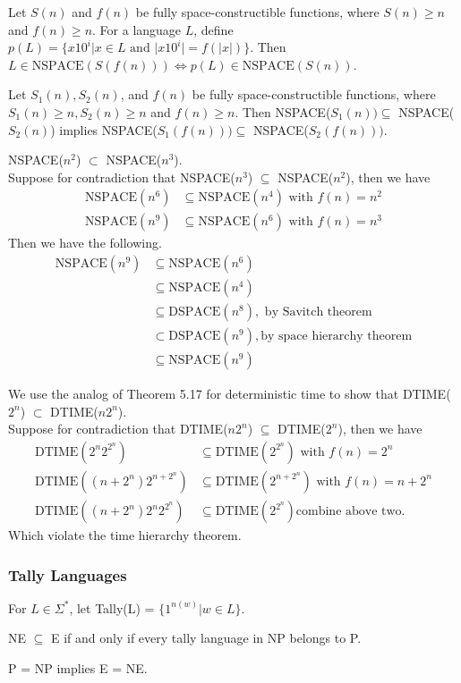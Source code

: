  Let $S(n)$ and $f(n)$ be fully space-constructible functions, where
$S(n) \ge n$ and $f(n) \ge n$. For a language $L$, define
$p(L) = \{x10^i | x \in L \text{ and }|x10^i | = f(|x|)\}$.
Then $L \in \text{NSPACE}(S(f(n))) \Leftrightarrow p(L) \in \text{NSPACE}(S(n))$.

 Let $S_1(n), S_2(n)$, and $f(n)$ be fully space-constructible functions,
where $S_1 (n) \ge n, S_2(n) \ge n$ and $f(n) \ge n$. Then
NSPACE($S_1(n)) \subseteq$ NSPACE($S_2(n)$) implies NSPACE($S_1(f(n)))
\subseteq$ NSPACE($S_2(f(n)))$.

 NSPACE($n^2$) $\subset$ NSPACE($n^3$).\\
Suppose for contradiction that NSPACE($n^3$) $\subseteq$ NSPACE($n^2$), then we 
have
\begin{align*}
  \text{NSPACE}(n^6) &\subseteq \text{NSPACE}(n^4) \text{ with } f(n)=n^2\\
  \text{NSPACE}(n^9) &\subseteq \text{NSPACE}(n^6) \text{ with } f(n)=n^3
\end{align*}
Then we have the following.
\begin{align*}
\text{NSPACE}(n^9) &\subseteq \text{NSPACE}(n^6) \\
&\subseteq \text{NSPACE}(n^4) \\
&\subseteq \text{DSPACE}(n^8), \text{ by Savitch theorem} \\
&\subset \text{DSPACE}(n^9), \text{by space hierarchy theorem} \\
&\subseteq \text{NSPACE}(n^9)
\end{align*}

 We use the analog of Theorem 5.17 for deterministic time to show
that DTIME($2^n$) $\subset$ DTIME($n2^n$).\\
Suppose for contradiction that DTIME($n2^n$) $\subseteq$ DTIME($2^n$), then we have 
\begin{align*}
\text{DTIME}(2^n2^{2^n}) &\subseteq \text{DTIME}(2^{2^n}) \text{ with } f(n) = 2^n\\
\text{DTIME}((n+2^n)2^{n+2^n}) &\subseteq \text{DTIME}(2^{n+2^n}) \text{ with }
f(n) = n+2^n\\
\text{DTIME}((n+2^n)2^{n}2^{2^n}) &\subseteq \text{DTIME}(2^{2^n}) \text{
combine above two.}
\end{align*}
Which violate the time hierarchy theorem.

\subsubsection{Tally Languages}

 For $L \in \Sigma^*$, let Tally(L) = $\{1^{n(w)} | w \in L\}$.

 NE $\subseteq$ E if and only if every tally language in NP belongs
to P.

 P = NP implies E = NE.
